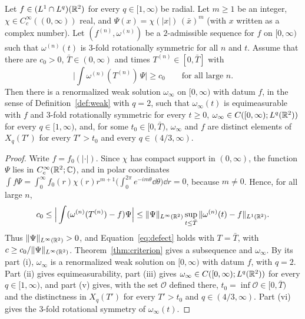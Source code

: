 \begin{corollary}
\label{cor:defect}
Let $f\in (L^1\cap L^q)(\mathbb{R}^2)$ for every $q\in[1,\infty)$ be radial. Let $m\ge1$
be an integer, $\chi\in C_c^\infty((0,\infty))$ real, and
$\Psi(x)=\chi(|x|)\,(\bar x)^m$ (with $x$ written as a complex number). Let
$(f^{(n)},\omega^{(n)})$ be a $2$-admissible sequence for $f$ on $[0,\infty)$
such that $\omega^{(n)}(t)$ is $3$-fold rotationally symmetric for all $n$ and $t$. Assume
that there are $c_0>0$, $\bar T\in(0,\infty)$ and times
$T^{(n)}\in[0,\bar T]$ with
\[
\Big|\int\omega^{(n)}(T^{(n)})\,\Psi\Big|\ge c_0\qquad\text{for all large }n.
\]
Then there is a renormalized weak solution $\omega_\infty$
on $[0,\infty)$ with datum $f$, in the sense of Definition~\ref{def:weak} with
$q=2$, such that $\omega_\infty(t)$ is equimeasurable
with $f$ and $3$-fold rotationally symmetric for every $t\ge0$,
$\omega_\infty\in C([0,\infty);L^q(\mathbb{R}^2))$ for every $q\in[1,\infty)$, and, for
some $t_0\in[0,\bar T)$, $\omega_\infty$ and $f$ are distinct elements of
$X_q(T')$ for every $T'>t_0$ and every $q\in(4/3,\infty)$.
\end{corollary}

\begin{proof}
Write $f=f_0(|\cdot|)$. Since $\chi$ has compact support in $(0,\infty)$, the
function $\Psi$ lies in $C_c^\infty(\mathbb{R}^2;\mathbb{C})$, and in polar coordinates
$\int f\Psi=\int_0^\infty f_0(r)\chi(r)r^{m+1}\big(\int_0^{2\pi}e^{-im\theta}\dd\theta\big)\dd r=0$,
because $m\ne0$. Hence, for all large $n$,
\[
c_0\le\Big|\int(\omega^{(n)}(T^{(n)})-f)\Psi\Big|
\le\|\Psi\|_{L^\infty(\mathbb{R}^2)}\sup_{t\le\bar T}\|\omega^{(n)}(t)-f\|_{L^1(\mathbb{R}^2)} .
\]
Thus $\|\Psi\|_{L^\infty(\mathbb{R}^2)}>0$, and Equation~\eqref{eq:defect} holds with
$T=\bar T$, with $c\ge c_0/\|\Psi\|_{L^\infty(\mathbb{R}^2)}$.
Theorem~\ref{thm:criterion} gives a subsequence and $\omega_\infty$. By its part
(i), $\omega_\infty$ is a renormalized weak solution on $[0,\infty)$ with datum
$f$, with $q=2$. Part (ii) gives equimeasurability, part (iii) gives
$\omega_\infty\in C([0,\infty);L^q(\mathbb{R}^2))$ for every $q\in[1,\infty)$, and part (v)
gives, with the set $\mathcal O$ defined there, $t_0=\inf\mathcal O\in[0,\bar T)$
and the distinctness in $X_q(T')$ for every $T'>t_0$ and $q\in(4/3,\infty)$.
Part (vi) gives the $3$-fold rotational symmetry of $\omega_\infty(t)$.
\end{proof}

